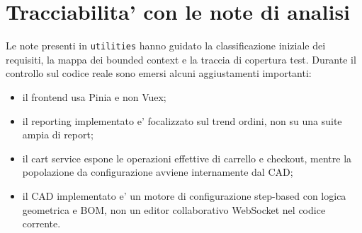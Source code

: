 \section{Tracciabilita' con le note di analisi}

Le note presenti in \texttt{utilities} hanno guidato la classificazione iniziale dei requisiti, la mappa dei bounded context e la traccia di copertura test. Durante il controllo sul codice reale sono emersi alcuni aggiustamenti importanti:

\begin{itemize}
\item il frontend usa Pinia e non Vuex;
\item il reporting implementato e' focalizzato sul trend ordini, non su una suite ampia di report;
\item il cart service espone le operazioni effettive di carrello e checkout, mentre la popolazione da configurazione avviene internamente dal CAD;
\item il CAD implementato e' un motore di configurazione step-based con logica geometrica e BOM, non un editor collaborativo WebSocket nel codice corrente.
\end{itemize}
